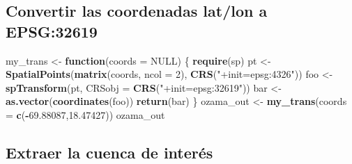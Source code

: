 \documentclass[11pt,]{article}
\newenvironment{Shaded}{\begin{snugshade}}{\end{snugshade}}
\newcommand{\KeywordTok}[1]{\textcolor[rgb]{0.13,0.29,0.53}{\textbf{#1}}}
\newcommand{\DataTypeTok}[1]{\textcolor[rgb]{0.13,0.29,0.53}{#1}}
\newcommand{\DecValTok}[1]{\textcolor[rgb]{0.00,0.00,0.81}{#1}}
\newcommand{\FloatTok}[1]{\textcolor[rgb]{0.00,0.00,0.81}{#1}}
\newcommand{\StringTok}[1]{\textcolor[rgb]{0.31,0.60,0.02}{#1}}
\newcommand{\CommentTok}[1]{\textcolor[rgb]{0.56,0.35,0.01}{\textit{#1}}}
\newcommand{\OtherTok}[1]{\textcolor[rgb]{0.56,0.35,0.01}{#1}}
\newcommand{\ControlFlowTok}[1]{\textcolor[rgb]{0.13,0.29,0.53}{\textbf{#1}}}
\newcommand{\OperatorTok}[1]{\textcolor[rgb]{0.81,0.36,0.00}{\textbf{#1}}}
\newcommand{\NormalTok}[1]{#1}
\begin{document}
\begin{Shaded}
\end{Shaded}

\subsection{Convertir las coordenadas lat/lon a
EPSG:32619}\label{convertir-las-coordenadas-latlon-a-epsg32619}

\begin{Shaded}
\begin{Highlighting}[]
\NormalTok{my_trans <-}\StringTok{ }\ControlFlowTok{function}\NormalTok{(}\DataTypeTok{coords =} \OtherTok{NULL}\NormalTok{) \{}
  \KeywordTok{require}\NormalTok{(sp)}
\NormalTok{  pt <-}\StringTok{ }\KeywordTok{SpatialPoints}\NormalTok{(}\KeywordTok{matrix}\NormalTok{(coords, }\DataTypeTok{ncol =} \DecValTok{2}\NormalTok{), }\KeywordTok{CRS}\NormalTok{(}\StringTok{"+init=epsg:4326"}\NormalTok{))}
\NormalTok{  foo <-}\StringTok{ }\KeywordTok{spTransform}\NormalTok{(pt, }\DataTypeTok{CRSobj =} \KeywordTok{CRS}\NormalTok{(}\StringTok{"+init=epsg:32619"}\NormalTok{))}
\NormalTok{  bar <-}\StringTok{ }\KeywordTok{as.vector}\NormalTok{(}\KeywordTok{coordinates}\NormalTok{(foo))}
  \KeywordTok{return}\NormalTok{(bar)}
\NormalTok{\}}
\NormalTok{ozama_out <-}\StringTok{ }\KeywordTok{my_trans}\NormalTok{(}\DataTypeTok{coords =} \KeywordTok{c}\NormalTok{(}\OperatorTok{-}\FloatTok{69.88087}\NormalTok{,}\FloatTok{18.47427}\NormalTok{))}
\NormalTok{ozama_out}
\end{Highlighting}
\end{Shaded}

\subsection{Extraer la cuenca de
interés}\label{extraer-la-cuenca-de-interuxe9s}
\end{document}
